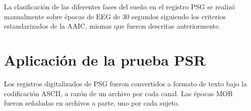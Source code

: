\documentclass[12pt,a4paper]{mitthesis}
\begin{document}
La clasificaci\'on de las diferentes fases del sue\~no en el registro PSG se realiz\'o manualmente 
sobre \'epocas de EEG de 30 segundos siguiendo los criterios 
estandarizados de la AAIC\cite{Hori01}, mismas que fueron descritas anteriormente.
%
%
%
%
%


\section{Aplicaci\'on de la prueba PSR}

Los registros digitalizados de PSG fueron convertidos a formato de texto bajo la codificaci\'on 
ASCII, a raz\'on de un archivo por cada canal. 
Las \'epocas MOR fueron se\~naladas en archivos a parte, uno por cada sujeto.
\end{document}

